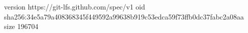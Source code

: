 version https://git-lfs.github.com/spec/v1
oid sha256:34e5a79a408368345f449592a99638b919c53edca59f73ffb0dc37fabc2a08aa
size 196704
